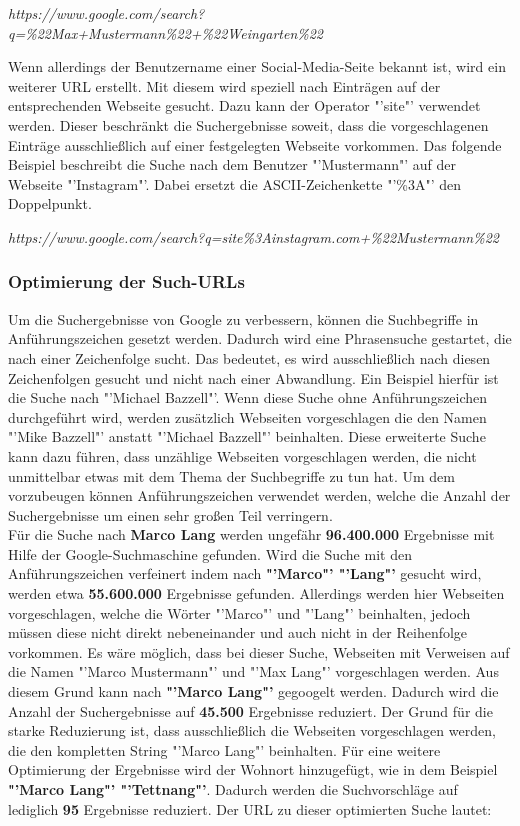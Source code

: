 			\textit{https://www.google.com/search?q=\%22Max+Mustermann\%22+\%22Weingarten\%22}
			
			Wenn allerdings der Benutzername einer Social-Media-Seite bekannt ist, wird ein weiterer URL erstellt. Mit diesem wird speziell nach Einträgen auf der entsprechenden Webseite gesucht. Dazu kann der Operator "'site"' verwendet werden. Dieser beschränkt die Suchergebnisse soweit, dass die vorgeschlagenen Einträge ausschließlich auf einer festgelegten Webseite vorkommen. Das folgende Beispiel beschreibt die Suche nach dem Benutzer "'Mustermann"' auf der Webseite "'Instagram"'. Dabei ersetzt die ASCII-Zeichenkette "'\%3A"' den Doppelpunkt. \cite{HTMLURL}
			
			\textit{https://www.google.com/search?q=site\%3Ainstagram.com+\%22Mustermann\%22}
			
			\subsubsection{Optimierung der Such-URLs}
			\label{subsubsec:URLOptimieren}
			Um die Suchergebnisse von Google zu verbessern, können die Suchbegriffe in Anführungszeichen gesetzt werden. Dadurch wird eine Phrasensuche gestartet, die nach einer Zeichenfolge sucht. Das bedeutet, es wird ausschließlich nach diesen Zeichenfolgen gesucht und nicht nach einer Abwandlung. Ein Beispiel hierfür ist die Suche nach "'Michael Bazzell"'. Wenn diese Suche ohne Anführungszeichen durchgeführt wird, werden zusätzlich Webseiten vorgeschlagen die den Namen "'Mike Bazzell"' anstatt "'Michael Bazzell"' beinhalten. Diese erweiterte Suche kann dazu führen, dass unzählige Webseiten vorgeschlagen werden, die nicht unmittelbar etwas mit dem Thema der Suchbegriffe zu tun hat. Um dem vorzubeugen können Anführungszeichen verwendet werden, welche die Anzahl der Suchergebnisse um einen sehr großen Teil verringern. \cite{Bazzell}\\
			Für die Suche nach \textbf{Marco Lang} werden ungefähr \textbf{96.400.000} Ergebnisse mit Hilfe der Google-Suchmaschine gefunden. Wird die Suche mit den Anführungszeichen verfeinert indem nach \textbf{"'Marco"' "'Lang"'} gesucht wird, werden etwa \textbf{55.600.000} Ergebnisse gefunden. Allerdings werden hier Webseiten vorgeschlagen, welche die Wörter "'Marco"' und "'Lang"' beinhalten, jedoch müssen diese nicht direkt nebeneinander und auch nicht in der Reihenfolge vorkommen. Es wäre möglich, dass bei dieser Suche, Webseiten mit Verweisen auf die Namen "'Marco Mustermann"' und "'Max Lang"' vorgeschlagen werden. Aus diesem Grund kann nach \textbf{"'Marco Lang"'} gegoogelt werden. Dadurch wird die Anzahl der Suchergebnisse auf \textbf{45.500} Ergebnisse reduziert. Der Grund für die starke Reduzierung ist, dass ausschließlich die Webseiten vorgeschlagen werden, die den kompletten String "'Marco Lang"' beinhalten. Für eine weitere Optimierung der Ergebnisse wird der Wohnort hinzugefügt, wie in dem Beispiel \textbf{"'Marco Lang"' "'Tettnang"'}. Dadurch werden die Suchvorschläge auf lediglich \textbf{95} Ergebnisse reduziert. Der URL zu dieser optimierten Suche lautet: 
			

